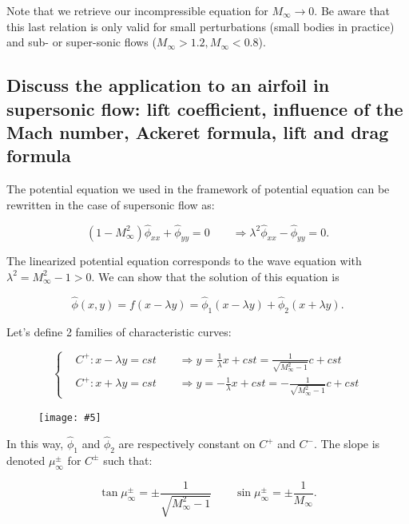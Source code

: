 \documentclass[british,french,11pt, a4paper, openany]{article}
\newcommand{\wrapfig}[6]{%
	\begin{figure}%
		\vspace{-5mm}%
		\texttt{[image: \#5]}%
		\captionof{figure}{}%
		\label{#6}%
	\end{figure}%
}
\begin{document}
Note that we retrieve our incompressible equation for $M_\infty \rightarrow 0$. Be aware that this last relation is only valid for small perturbations (small bodies in practice) and sub- or super-sonic flows ($M_\infty > 1.2, M_\infty < 0.8$). 


\subsection{Discuss the application to an airfoil in supersonic flow: lift coefficient, influence of the Mach number, Ackeret formula, lift and drag formula}
\label{Ackeret}

The potential equation we used in the framework of potential equation can be rewritten in the case of supersonic flow as:

\begin{equation}
(1-M_\infty^2) \hat{\phi}_{xx} + \hat{\phi}_{yy} = 0 \qquad \Rightarrow \lambda ^2 \hat{\phi} _{xx} - \hat{\phi} _{yy} = 0.
\end{equation}

The linearized potential equation corresponds to the wave equation with $\lambda ^2 = M_\infty ^2 -1 >0$. We can show that the solution of this equation is 

\begin{equation}
\hat{\phi}(x,y)= f(x-\lambda y) = \hat{\phi} _{1}(x-\lambda y) + \hat{\phi} _{2} (x+\lambda y).
\end{equation}		

Let's define 2 families of characteristic curves:

\begin{equation}
\left\{
\begin{aligned}
&C^+ : x-\lambda y = cst \qquad \Rightarrow y = \frac{1}{\lambda} x + cst = \frac{1}{\sqrt{M_\infty ^2 -1}} c + cst\\
&C^+ : x+\lambda y = cst \qquad \Rightarrow y = -\frac{1}{\lambda} x + cst = -\frac{1}{\sqrt{M_\infty ^2 -1}} c + cst
\end{aligned}
\right.
\end{equation}

\wrapfig{8}{r}{5}{0.15}{ch6/8}{fig:6.8}
In this way, $\hat{\phi} _1$ and $\hat{\phi} _2$ are respectively constant on $C^+$ and $C^-$. The slope is denoted $\mu _\infty ^\pm$ for $C^\pm$ such that: 

\begin{equation}
\tan \mu _\infty ^\pm = \pm \frac{1}{\sqrt{M_\infty ^2 -1}} \qquad \sin \mu _\infty ^\pm = \pm \frac{1}{M_\infty}.
\end{equation}
\end{document}
